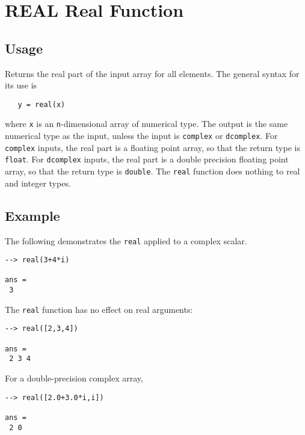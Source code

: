 \section{REAL Real Function}

\subsection{Usage}

Returns the real part of the input array for all elements.  The 
general syntax for its use is
\begin{verbatim}
   y = real(x)
\end{verbatim}
where \verb|x| is an \verb|n|-dimensional array of numerical type.  The output 
is the same numerical type as the input, unless the input is \verb|complex|
or \verb|dcomplex|.  For \verb|complex| inputs, the real part is a floating
point array, so that the return type is \verb|float|.  For \verb|dcomplex|
inputs, the real part is a double precision floating point array, so that
the return type is \verb|double|.  The \verb|real| function does
nothing to real and integer types.
\subsection{Example}

The following demonstrates the \verb|real| applied to a complex scalar.
\begin{verbatim}
--> real(3+4*i)

ans = 
 3 
\end{verbatim}
The \verb|real| function has no effect on real arguments:
\begin{verbatim}
--> real([2,3,4])

ans = 
 2 3 4 
\end{verbatim}
For a double-precision complex array,
\begin{verbatim}
--> real([2.0+3.0*i,i])

ans = 
 2 0 
\end{verbatim}
